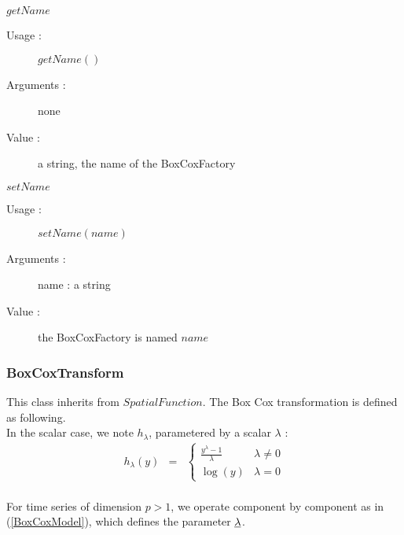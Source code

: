 \begin{description}
\begin{description}
  \item $getName$
    \begin{description}
    \item[Usage :] $getName()$
    \item[Arguments :] none
    \item[Value :] a string, the name of the BoxCoxFactory
    \end{description}
    \bigskip

  \item $setName$
    \begin{description}
    \item[Usage :] $setName(name)$
    \item[Arguments :] name : a string
    \item[Value :] the BoxCoxFactory is named $name$
    \end{description}
    \bigskip


  \end{description}

\end{description}


\newpage \subsubsection{BoxCoxTransform}

This class inherits from $SpatialFunction$. The Box Cox transformation is defined as following.\\
In the scalar case, we note $h_\lambda$,  parametered by a scalar $\lambda$ :
\begin{eqnarray}
 \label{BoxCoxModel}
 h_\lambda(y) & = &
\left\{
\begin{array}{ll}
\frac{y^\lambda-1}{\lambda} & \lambda \neq 0 \\
\log(y) 			   & \lambda = 0
\end{array}
\right.
\end{eqnarray}\\
For time series of dimension $p>1$, we operate component by component as in (\ref{BoxCoxModel}), which defines the parameter ${\underline{\lambda}}$.

